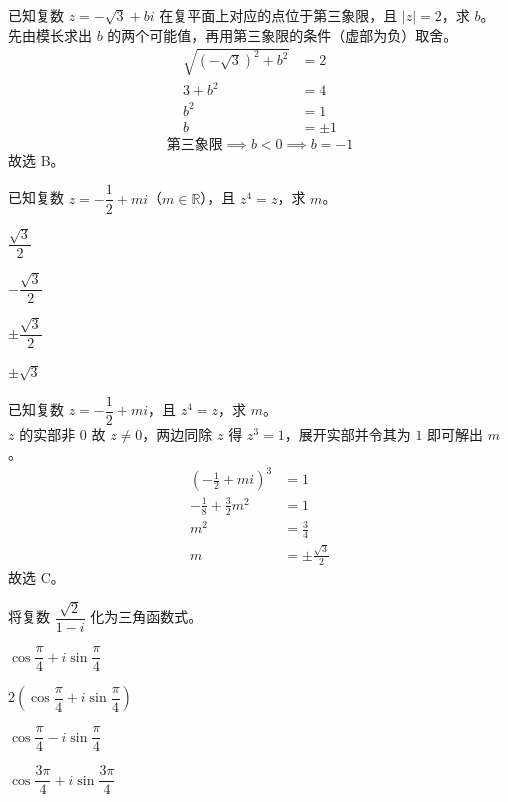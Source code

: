 \documentclass[12pt,a4paper]{exam-zh}
\begin{document}
\begin{solution}
    已知复数 $z=-\sqrt{3}+bi$ 在复平面上对应的点位于第三象限，且 $|z|=2$，求 $b$。 \\
    先由模长求出 $b$ 的两个可能值，再用第三象限的条件（虚部为负）取舍。 \\
    \begin{align*}
        \sqrt{(-\sqrt3)^2+b^2} &= 2 \\
        3+b^2 &= 4 \\
        b^2 &= 1 \\
        b &= \pm1
    \end{align*}
    \[
        \text{第三象限} \implies b<0 \implies b=-1
    \]
    故选 B。
\end{solution}

\begin{question}
    已知复数 $z=-\dfrac{1}{2}+mi$（$m\in\mathbb{R}$），且 $z^4=z$，求 $m$。 \paren[2]
    \begin{choices}
        \item $\dfrac{\sqrt3}{2}$
        \item $-\dfrac{\sqrt3}{2}$
        \item $\pm\dfrac{\sqrt3}{2}$
        \item $\pm\sqrt3$
    \end{choices}
\end{question}

\begin{solution}
    已知复数 $z=-\dfrac{1}{2}+mi$，且 $z^4=z$，求 $m$。 \\
    $z$ 的实部非 $0$ 故 $z\neq0$，两边同除 $z$ 得 $z^3=1$，展开实部并令其为 $1$ 即可解出 $m$。 \\
    \begin{align*}
        \left(-\frac{1}{2}+mi\right)^3 &= 1 \\
        -\frac{1}{8}+\frac{3}{2}m^2 &= 1 \\
        m^2 &= \frac{3}{4} \\
        m &= \pm\frac{\sqrt{3}}{2}
    \end{align*}
    故选 C。
\end{solution}

\begin{question}
    将复数 $\dfrac{\sqrt{2}}{1-i}$ 化为三角函数式。 \paren[A]
    \begin{choices}[columns=2, linesep=0.5em]
        \item $\cos\dfrac{\pi}{4}+i\sin\dfrac{\pi}{4}$
        \item $2\left(\cos\dfrac{\pi}{4}+i\sin\dfrac{\pi}{4}\right)$
        \item $\cos\dfrac{\pi}{4}-i\sin\dfrac{\pi}{4}$
        \item $\cos\dfrac{3\pi}{4}+i\sin\dfrac{3\pi}{4}$
    \end{choices}
\end{question}
\end{document}
